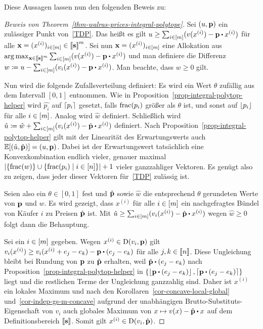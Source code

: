 Diese Aussagen lassen nun den folgenden Beweis zu:
\begin{proof}[Beweis von Theorem~\ref{thm-walras-prices-integral-polytope}]
	Sei $(u, \mathbf{p})$ ein zulässiger Punkt von~\eqref{TDP}.
	Das heißt es gilt $u \geq \sum_{i\in\first{m}} ( v(x^{(i)}) - \fp \bcdot x^{(i)})$ für alle $\mathbf{x} = (x^{(i)})_{i\in\left[ m \right]}\in\left\llbracket \mathbf{s} \right\rrbracket^m$.
	Sei nun $\mathbf{x} = (x^{(i)})_{i\in\left[ m \right]}$ eine Allokation aus $\arg\max_{\fx\in\ffirst{\fs}^m} \sum_{i\in\first{m}} (v(x^{(i)}) - \fp \bcdot x^{(i)})$ und man definiere die Differenz $w \coloneqq u - \sum_{i\in\first{m}} (v_i(x^{(i)}) - \fp \bcdot x^{(i)})$.
	Man beachte, dass $w \geq 0$ gilt.
	
	Nun wird die folgende Zufallsverteilung definiert:
	Es wird ein Wert $\theta$ zufällig aus dem Intervall $[0,1]$ entnommen.
	Wie in Proposition~\ref{prop-integral-polytop-helper} wird $\hat{p_i}$ auf $\left\lceil p_i \right\rceil$ gesetzt, falls $\operatorname{frac}(p_i)$ größer als $\theta$ ist, und sonst auf $\left\lfloor p_i \right\rfloor$ für alle $i\in\left[ m \right]$.
	Analog wird $\hat{w}$ definiert.
	Schließlich wird $\hat{u}\coloneqq\hat{w}+ \sum_{i\in\first{m}} (v_i(x^{(i)}) - \hat{\fp} \bcdot x^{(i)})$ definiert.
	Nach Proposition~\ref{prop-integral-polytop-helper} gilt mit der Linearität des Erwartungswerts auch $\mathbb{E}[(\hat{u},\hat{\mathbf{p}})] = (u, \mathbf{p})$.
	Dabei ist der Erwartungswert tatsächlich eine Konvexkombination endlich vieler, genauer maximal $\left\lvert  \{ \operatorname{frac}(w) \} \cup \{ \operatorname{frac}(p_i) \mid i\in\left[ n \right] \}  \right\rvert + 1$ vieler ganzzahliger Vektoren.
	Es genügt also zu zeigen, dass jeder dieser Vektoren für~\eqref{TDP} zulässig ist.
	
	Seien also ein $\theta\in [0,1]$ fest und $\hat{\mathbf{p}}$ sowie $\hat{w}$ die entsprechend $\theta$ gerundeten Werte von $\mathbf{p}$ und $w$.
	Es wird gezeigt, dass $x^{(i)}$ für alle $i\in\left[ m \right]$ ein nachgefragtes Bündel von Käufer $i$ zu Preisen $\hat{\mathbf{p}}$ ist.
	Mit $\hat{u}\geq \sum_{i\in\first{m}}(v_i(x^{(i)}) - \hat{\fp}\bcdot x^{(i)})$ wegen $\hat{w}\geq0$ folgt dann die Behauptung.
	
	Sei ein $i\in\left[ m \right]$ gegeben. Wegen $x^{(i)}\in\operatorname{D}(v_i, \mathbf{p})$ gilt $v_i(x^{(i)}) \geq v_i(x^{(i)} + e_j - e_k) - \fp \bcdot (e_j - e_k)$ für alle $j,k\in\left\llbracket n \right\rrbracket$.
	Diese Ungleichung bleibt bei Rundung von $\mathbf{p}$ zu $\hat{\mathbf{p}}$ erhalten, weil $\hat{\fp}\bcdot (e_j - e_k)$ nach Proposition~\ref{prop-integral-polytop-helper} in $\{ \floor{\fp\bcdot(e_j - e_k)}, \ceil{\fp\bcdot(e_j - e_k)} \}$ liegt und die rest\-lichen Terme der Ungleichung ganzzahlig sind.
	Daher ist $x^{(i)}$ ein lokales Maximum und nach den Korollaren~\ref{cor-concave-local-global} und~\ref{cor-indep-gs-m-concave} aufgrund der unabhängigen Brutto-Substituts-Eigenschaft von $v_i$ auch globales Maximum von $x\mapsto v(x) - \hat{\fp} \bcdot x$ auf dem Definitionsbereich $\left\llbracket \mathbf{s} \right\rrbracket$.
	Somit gilt $x^{(i)}\in\operatorname{D}(v_i, \hat{\mathbf{p}})$.
\end{proof}
